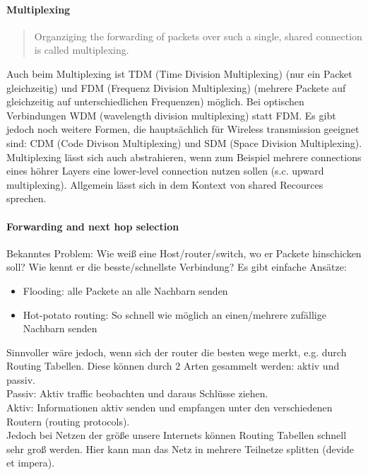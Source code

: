 	\paragraph{Multiplexing}
		\begin{quote}
			\frQuo Organziging the forwarding of packets over such a single, shared connection is called multiplexing.\frQuc
		\end{quote}
		Auch beim Multiplexing ist TDM (Time Division Multiplexing) (nur ein Packet gleichzeitig) und FDM (Frequenz Division Multiplexing) (mehrere Packete auf gleichzeitig auf unterschiedlichen Frequenzen) möglich. Bei optischen Verbindungen WDM (wavelength division multiplexing) statt FDM. 
		Es gibt jedoch noch weitere Formen, die hauptsächlich für Wireless transmission geeignet sind: CDM (Code Divison Multiplexing) und SDM (Space Division Multiplexing). \\
		Multiplexing lässt sich auch abstrahieren, wenn zum Beispiel mehrere connections eines höhrer Layers eine lower-level connection nutzen sollen (s.c. upward multiplexing). Allgemein lässt sich in dem Kontext von shared Recources sprechen.

	\paragraph{Forwarding and next hop selection}
		Bekanntes Problem: Wie weiß eine Host/router/switch, wo er Packete hinschicken soll? Wie kennt er die besste/schnellste Verbindung? Es gibt einfache Ansätze:
		\begin{itemize}
			\item Flooding: alle Packete an alle Nachbarn senden
			\item Hot-potato routing: So schnell wie möglich an einen/mehrere zufällige Nachbarn senden
		\end{itemize}
		Sinnvoller wäre jedoch, wenn sich der router die besten wege merkt, e.g. durch Routing Tabellen. Diese können durch 2 Arten gesammelt werden: aktiv und passiv. \\
		Passiv: Aktiv traffic beobachten und daraus Schlüsse ziehen. \\
		Aktiv: Informationen aktiv senden und empfangen unter den verschiedenen Routern (routing protocols). \\
		Jedoch bei Netzen der größe unsere Internets können Routing Tabellen schnell sehr groß werden. Hier kann man das Netz in mehrere Teilnetze splitten (devide et impera). 
		
